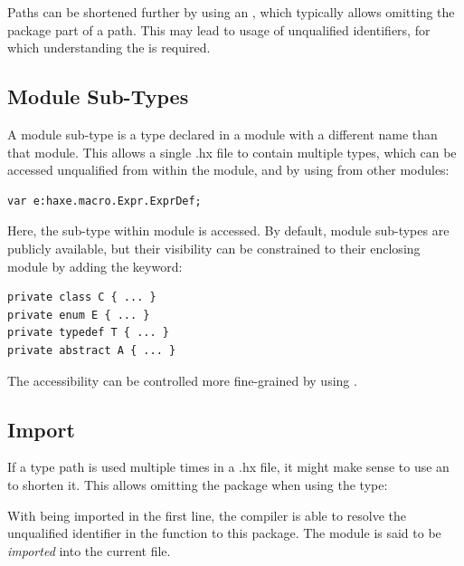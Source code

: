 \documentclass{haxe}
\begin{document}
Paths can be shortened further by using an , which typically allows omitting the package part of a path. This may lead to usage of unqualified identifiers, for which understanding the  is required.



\subsection{Module Sub-Types}
\label{type-system-module-sub-types}

A module sub-type is a type declared in a module with a different name than that module. This allows a single .hx file to contain multiple types, which can be accessed unqualified from within the module, and by using  from other modules:

\begin{lstlisting}
var e:haxe.macro.Expr.ExprDef;
\end{lstlisting}
Here, the sub-type  within module  is accessed. By default, module sub-types are publicly available, but their visibility can be constrained to their enclosing module by adding the  keyword:

\begin{lstlisting}
private class C { ... }
private enum E { ... }
private typedef T { ... }
private abstract A { ... }
\end{lstlisting}
The accessibility can be controlled more fine-grained by using .




\subsection{Import}
\label{type-system-import}

If a type path is used multiple times in a .hx file, it might make sense to use an  to shorten it. This allows omitting the package when using the type:


With  being imported in the first line, the compiler is able to resolve the unqualified identifier  in the  function to this package. The module  is said to be \emph{imported} into the current file.
\end{document}
